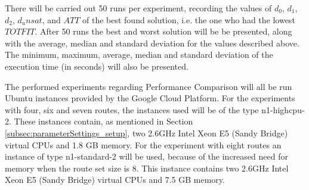 There will be carried out 50 runs per experiment, recording the values of $d_0$, $d_1$, $d_2$, $d_unsat$, and $ATT$ of the best found solution, i.e. the one who had the lowest $TOTFIT$. After 50 runs the best and worst solution will be be presented, along with the average, median and standard deviation for the values described above. The minimum, maximum, average, median and standard deviation of the execution time (in seconds) will also be presented.  

The performed experiments regarding Performance Comparison will all be run Ubuntu instances provided by the Google Cloud Platform. For the experiments with four, six and seven routes, the instances used will be of the type n1-highcpu-2. These instances contain, as mentioned in Section \vref{subsec:parameterSettings_setup}, two 2.6GHz Intel Xeon E5 (Sandy Bridge) virtual CPUs and 1.8 GB memory\cite{website:google}. For the experiment with eight routes an instance of type n1-standard-2 will be used, because of the increased need for memory when the route set size is 8. This instance contains two 2.6GHz Intel Xeon E5 (Sandy Bridge) virtual CPUs and 7.5 GB memory\cite{website:google}.


